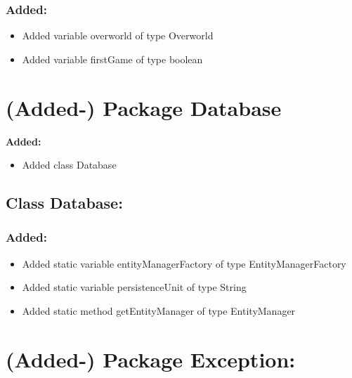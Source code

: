 \documentclass{article}
\begin{document}
\subsubsection{Added:}
\begin{itemize}
\item Added variable overworld of type Overworld
\item Added variable firstGame of type boolean
\end{itemize}


\section{(Added-) Package Database}

\textbf{Added:}
\begin{itemize}
\item Added class Database
\end{itemize}


\subsection{Class Database:}

\subsubsection{Added:}
\begin{itemize}
\item Added static variable entityManagerFactory of type EntityManagerFactory
\item Added static variable persistenceUnit of type String
\item Added static method getEntityManager of type EntityManager 
\end{itemize}


\section{(Added-) Package Exception:}
\end{document}

